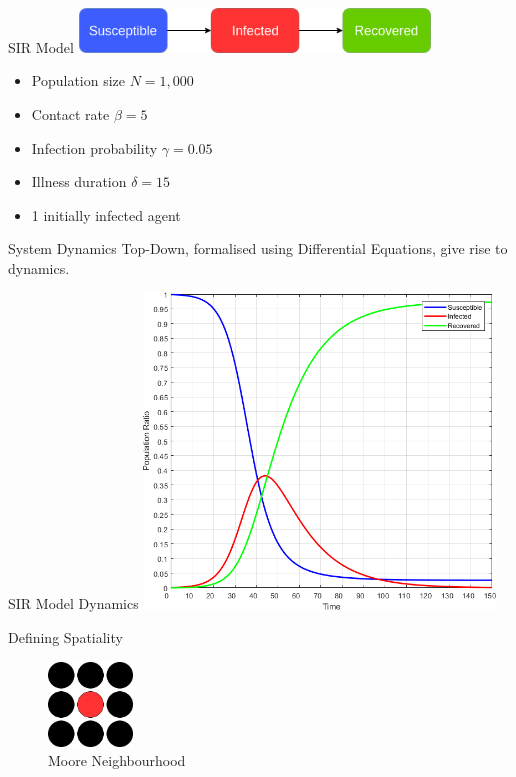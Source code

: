 \documentclass{beamer}
\begin{document}
\begin{frame}{SIR Model}
  \includegraphics[width=0.7\textwidth]{./fig/SIR_transitions.png}
  
  \begin{itemize}
    \item Population size $N = 1,000$
 	\item Contact rate $\beta = 5$
 	\item Infection probability $\gamma = 0.05$
 	\item Illness duration $\delta = 15$
 	\item 1 initially infected agent
  \end{itemize}
    
  \begin{block}{System Dynamics}
    Top-Down, formalised using Differential Equations, give rise to dynamics.
  \end{block}
\end{frame}

\begin{frame}{SIR Model Dynamics}
  \center
  \includegraphics[width=0.7\textwidth]{./fig/SIR_SD_001dt.png}
\end{frame}

\begin{frame}[fragile]{Defining Spatiality}
\begin{figure}
\begin{center}
\includegraphics[width=0.2\textwidth]{./fig/moore.png}
\caption*{Moore Neighbourhood}
\end{center}
\end{figure}
\end{frame}
\end{document}
